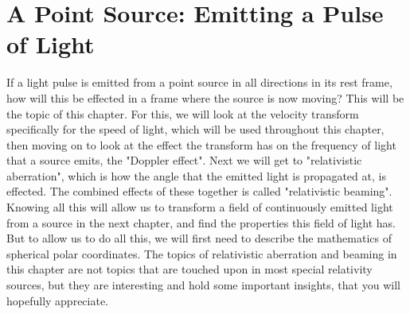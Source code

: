 

\printbibliography[segment=\therefsegment, heading=subbibliography]

\chapter{A Point Source: Emitting a Pulse of Light} \label{ch: A Point Source Emitting a Pulse of Light}




If a light pulse is emitted from a point source in all directions in its rest frame, how will this be effected in a frame where the source is now moving?
This will be the topic of this chapter.
For this, we will look at the velocity transform specifically for the speed of light, which will be used throughout this chapter, then moving on to look at the effect the transform has on the frequency of light that a source emits, the "Doppler effect".
Next we will get to "relativistic aberration", which is how the angle that the emitted light is propagated at, is effected.
The combined effects of these together is called "relativistic beaming".
Knowing all this will allow us to transform a field of continuously emitted light from a source in the next chapter, and find the properties this field of light has.
But to allow us to do all this, we will first need to describe the mathematics of spherical polar coordinates.
The topics of relativistic aberration and beaming in this chapter are not topics that are touched upon in most special relativity sources, but they are interesting and hold some important insights, that you will hopefully appreciate.

